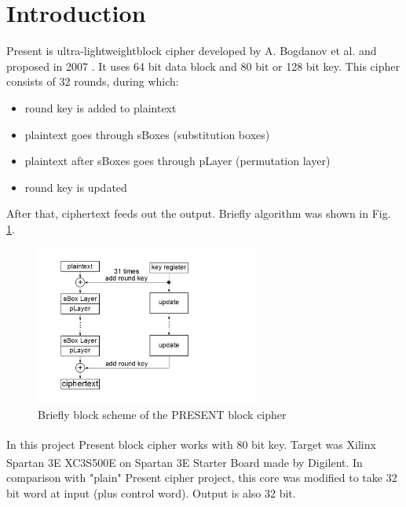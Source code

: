 \documentclass{gajewski}
\begin{document}
\maketitle

\newpage

\revisionTable

\newpage

\tableofcontents
\newpage

\section{Introduction}

Present is \textgravedbl ultra-lightweight\textacutedbl \space block cipher developed by A. Bogdanov et al. and proposed in 2007 \cite{PRESENT}. It uses 64 bit data block and 80 bit or 128 bit key.
This cipher consists of 32 rounds, during which: 
\begin{itemize}
    \item round key is added to plaintext
    \item plaintext goes through sBoxes (substitution boxes)
    \item plaintext after sBoxes goes through pLayer (permutation layer)
    \item round key is updated
\end{itemize}
After that, ciphertext feeds out the output. Briefly algorithm was shown in Fig. \ref{pAlgorithm}.
\begin{figure}[!ht]%
    \begin{center}
    \includegraphics[width=0.66\textwidth]{img/presentAlgorithm.png}
    \caption{%
        Briefly block scheme of the PRESENT block cipher
     }%
    \label{pAlgorithm}
    \end{center}
 \end{figure}
In this project Present block cipher works with 80 bit key. Target was Xilinx\textsuperscript{\textregistered} Spartan 3E XC3S500E \cite{Spartan} on Spartan 3E  Starter Board \cite{Digilent} made by Digilent\textsuperscript{\textregistered}. In comparison with "plain" Present cipher project, this core was modified to take 32 bit word at input (plus control word). Output is also 32 bit.
\end{document}
